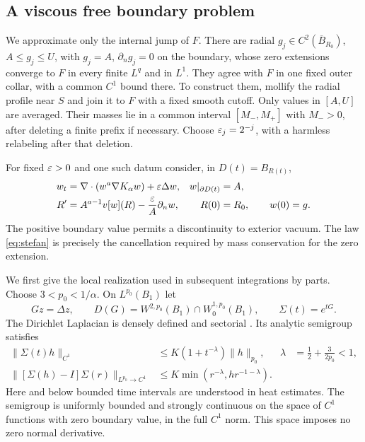 \subsection{A viscous free boundary problem}

We approximate only the internal jump of $F$. There are radial
$g_j\in C^2(\overline B_{R_0})$, $A\leq g_j\leq U$, with
$g_j=A$, $\partial_ng_j=0$ on the boundary, whose zero extensions converge
to $F$ in every finite $L^q$ and in $L^1$. They agree with $F$ in one fixed
outer collar, with a common $C^1$ bound there. To construct them, mollify
the radial profile near $S$ and join it to $F$ with a fixed smooth cutoff.
Only values in $[A,U]$ are averaged. Their masses lie in a common interval
$[M_-,M_+]$ with $M_->0$, after deleting a finite prefix if necessary.
Choose $\varepsilon_j=2^{-j}$, with a harmless relabeling after that deletion.

For fixed $\varepsilon>0$ and one such datum consider, in $D(t)=B_{R(t)}$,
\begin{align}
 w_t&=\nabla\cdot(w^a\nabla K_\alpha w)+\varepsilon\Delta w,
 &w|_{\partial D(t)}&=A,\label{eq:viscous}\\
 R'&=A^{a-1}v[w](R)-\frac{\varepsilon} A\partial_nw,
 &R(0)&=R_0,\qquad w(0)=g.\label{eq:stefan}
\end{align}
The positive boundary value permits a discontinuity to exterior vacuum.
The law \eqref{eq:stefan} is precisely the cancellation required by mass
conservation for the zero extension.

We first give the local realization used in subsequent integrations by
parts. Choose $3<p_0<1/\alpha$. On $L^{p_0}(B_1)$ let
\[
 Gz=\Delta z,\qquad D(G)=W^{2,p_0}(B_1)\cap W^{1,p_0}_0(B_1),
 \qquad \Sigma(t)=e^{tG}.
\]
The Dirichlet Laplacian is densely defined and sectorial
\cite[Section~2.4]{Lunardi2004}. Its analytic semigroup satisfies
\begin{align}
 \|\Sigma(t)h\|_{C^1}&\leq K(1+t^{-\lambda})\|h\|_{p_0},
 &\lambda&=\frac12+\frac3{2p_0}<1,\label{eq:heat-smoothing}\\
 \|[\Sigma(h)-I]\Sigma(r)\|_{L^{p_0}\to C^1}
 &\leq K\min(r^{-\lambda},hr^{-1-\lambda}).\label{eq:heat-increment}
\end{align}
Here and below bounded time intervals are understood in heat estimates.
The semigroup is uniformly bounded and strongly continuous on the space of
$C^1$ functions with zero boundary value, in the full $C^1$ norm.
This space imposes no zero normal derivative.


